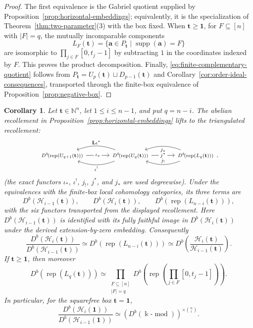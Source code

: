 \documentclass[12pt,reqno]{amsart}
\newtheorem{corollary}[theorem]{Corollary}
\theoremstyle{definition}
\theoremstyle{remark}
\newcommand{\Rep}{\operatorname{rep}}
\newcommand{\modcat}{\operatorname{mod}}
\begin{document}
\begin{proof}
The first equivalence is the Gabriel quotient supplied by
Proposition~\ref{prop:horizontal-embeddings}; equivalently, it is the
specialization of Theorem~\ref{thm:two-parameter}(3) with the box fixed.
When $\mathbf t\ge\mathbf1$, for $F\subseteq[n]$ with $|F|=q$, the mutually incomparable
components
\[
L_F(\mathbf t)=\{\mathbf a\in P_{\mathbf t}\mid
\operatorname{supp}(\mathbf a)=F\}
\]
are isomorphic to $\prod_{j\in F}[0,t_j-1]$ by subtracting $1$ in the
coordinates indexed by $F$.  This proves the product decomposition.  Finally,
\eqref{eq:finite-complementary-quotient} follows from
$P_{\mathbf t}=U_p(\mathbf t)\sqcup D_{p-1}(\mathbf t)$ and
Corollary~\ref{cor:order-ideal-consequences}, transported through the
finite-box equivalence of Proposition~\ref{prop:negative-box}.
\end{proof}

\begin{corollary}\label{cor:derived-horizontal-recollement}
Let $\mathbf t\in\mathbb N^n$, let $1\le i\le n-1$, and put $q=n-i$.
The abelian recollement in Proposition~\ref{prop:horizontal-embeddings} lifts
to the triangulated recollement:
\[
\begin{tikzcd}[column sep=3.4em]
{\scriptstyle D^b\!\left(\Rep(U_{q+1}(\mathbf t))\right)}
  \arrow[r, "{\scriptstyle \iota_*}" description]
& {\scriptstyle D^b\!\left(\Rep(U_q(\mathbf t))\right)}
  \arrow[l, bend right=20, "{\scriptstyle \mathbf L\iota^*}"']
  \arrow[l, bend left=20, "{\scriptstyle \iota^!}"]
  \arrow[r, "{\scriptstyle j^*}" description]
& {\scriptstyle D^b\!\left(\Rep(L_q(\mathbf t))\right)}
  \arrow[l, bend left=20, "{\scriptstyle j_!}"']
  \arrow[l, bend right=20, "{\scriptstyle j_*}"]
\end{tikzcd}.
\]
(the exact functors $\iota_*$, $\iota^!$, $j_!$, $j^*$, and $j_*$ are used degreewise).  Under the equivalences with the finite-box local cohomology categories, its three terms are
\[
D^b\!\left(\mathcal H_{i-1}(\mathbf t)\right),
\qquad
D^b\!\left(\mathcal H_i(\mathbf t)\right),
\qquad
D^b\!\left(\Rep(L_{n-i}(\mathbf t))\right),
\]
with the six functors transported from the displayed recollement.
Here $D^b(\mathcal H_{i-1}(\mathbf t))$ is identified with its fully faithful
image in $D^b(\mathcal H_i(\mathbf t))$ under the derived extension-by-zero
embedding.  Consequently
\[
\frac{D^b(\mathcal H_i(\mathbf t))}
     {D^b(\mathcal H_{i-1}(\mathbf t))}
\simeq
D^b\!\left(\Rep(L_{n-i}(\mathbf t))\right)
\simeq
D^b\!\left(
\frac{\mathcal H_i(\mathbf t)}{\mathcal H_{i-1}(\mathbf t)}
\right).
\]
If $\mathbf t\ge\mathbf1$, then moreover
\[
D^b\!\left(\Rep(L_q(\mathbf t))\right)
\simeq
\prod_{\substack{F\subseteq[n]\\|F|=q}}
D^b\!\left(\Rep\!\left(\prod_{j\in F}[0,t_j-1]\right)\right).
\]
In particular, for the squarefree box $\mathbf t=\mathbf1$,
\[
\frac{D^b(\mathcal H_i(\mathbf1))}
     {D^b(\mathcal H_{i-1}(\mathbf1))}
\simeq
\left(D^b(\Bbbk\text{-}\modcat)\right)^{\times\binom{n}{i}}.
\]
\end{corollary}
\end{document}

